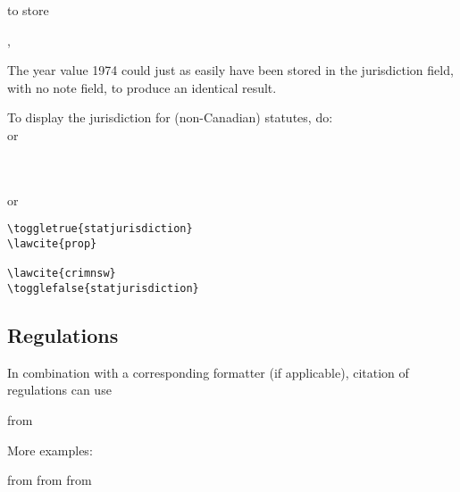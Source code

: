 to store\medskip

,  \fbox{\strut \ } \medskip

The year value 1974 could just as easily have been stored in the jurisdiction field, with no note field, to produce an identical result.\bigskip

\p To display the jurisdiction for (non-Canadian) statutes, do:\\
{\footnotesize\textcolor{blue}{}}
or
{\footnotesize\textcolor{blue}{}}
   \toggletrue{statjurisdiction}

   \\
   \\
{\footnotesize\textcolor{blue}{}}
or
{\footnotesize\textcolor{blue}{}}
\togglefalse{statjurisdiction}\par\bigskip

\begin{magpar}
\begin{verbatim}
\toggletrue{statjurisdiction}
\lawcite{prop}
  
\lawcite{crimnsw}
\togglefalse{statjurisdiction}
\end{verbatim}
\end{magpar}


\subsection{Regulations}

\p In combination with a corresponding formatter  (if applicable), citation of regulations can use 

from


More examples:

\bigskip
{} from 
{} from 
{} from 


